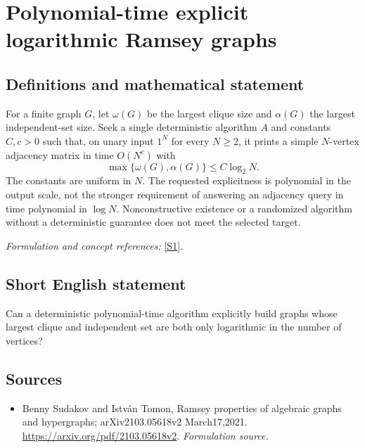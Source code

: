 \documentclass[11pt]{article}
\begin{document}
\section*{\texorpdfstring{Polynomial-time explicit logarithmic Ramsey graphs}{Polynomial-time explicit logarithmic Ramsey graphs}}\label{280}
\subsection{Definitions and mathematical statement}
For a finite graph $G$, let $\omega(G)$ be the largest clique size and $\alpha(G)$ the largest independent-set size. Seek a single deterministic algorithm $A$ and constants $C,c>0$ such that, on unary input $1^N$ for every $N\ge2$, it prints a simple $N$-vertex adjacency matrix in time $O(N^c)$ with
\[
 \max\{\omega(G),\alpha(G)\}\le C\log_2N.
\]
The constants are uniform in $N$. The requested explicitness is polynomial in the output scale, not the stronger requirement of answering an adjacency query in time polynomial in $\log N$. Nonconstructive existence or a randomized algorithm without a deterministic guarantee does not meet the selected target.
\par\smallskip\textit{Formulation and concept references:} \href{https://arxiv.org/pdf/2103.05618v2}{[S1]}.

\subsection{Short English statement}
Can a deterministic polynomial-time algorithm explicitly build graphs whose largest clique and independent set are both only logarithmic in the number of vertices?
\subsection{Sources}
\begin{itemize}
\item[S1]Benny Sudakov and István Tomon, Ramsey properties of algebraic graphs and hypergraphs; arXiv2103.05618v2 March17,2021.
\url{https://arxiv.org/pdf/2103.05618v2}.
\textit{Formulation source.}
\end{itemize}
\end{document}
